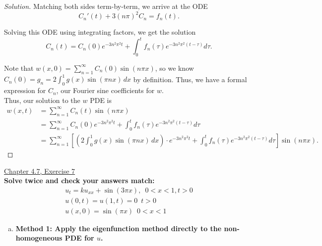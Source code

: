 \documentclass[11pt]{article}
\newenvironment{solution}
  {\renewcommand\qedsymbol{$\blacksquare$}\begin{proof}[Solution]}
  {\end{proof}}
\begin{document}
\begin{solution}
Matching both sides term-by-term, we arrive at the ODE
\[ C_n'(t) + 3(n\pi)^2 C_n = f_n(t).\]

Solving this ODE using integrating factors, we get the solution
\[ C_n(t) = C_n(0)e^{-3n^2\pi^2t} + \int_0^t f_n(\tau) e^{-3n^2\pi^2 (t-\tau)} d\tau. \]

Note that $w(x, 0) = \sum\limits_{n=1}^{\infty} C_n(0)\sin(n\pi x)$, so we know $C_n(0) = g_n = 2\int_0^1 g(x) \sin(\pi n x) \, dx$ by definition. Thus, we have a formal expression for $C_n$, our Fourier sine coefficients for $w$. \\

Thus, our solution to the $w$ PDE is 
\begin{align*}w(x, t) &= \sum\limits_{n=1}^{\infty} C_n(t) \sin(n\pi x) \\
&= \sum\limits_{n=1}^{\infty} C_n(0)e^{-3n^2\pi^2t} + \int_0^t f_n(\tau) e^{-3n^2\pi^2 (t-\tau)} d\tau \\
&= \sum\limits_{n=1}^{\infty} \left[\left(2\int_0^1 g(x) \sin(\pi n x) \, dx\right) \cdot e^{-3n^2\pi^2 t} + \int_0^t f_n(\tau) e^{-3n^2\pi^2 (t-\tau)} d\tau\right]\sin(n\pi x). \end{align*}
\end{solution}

\newpage

\underline{Chapter 4.7, Exercise 7} \\

\textbf{Solve twice and check your answers match:}
\[\begin{array}{c}
u_t = ku_{xx} + \sin(3\pi x), \, \, \, 0 < x < 1, t > 0 \\
u(0, t) = u(1, t) = 0 \, \, \, t>0 \\
u(x,0) = \sin(\pi x) \, \, \, 0 < x < 1
\end{array}\]


\begin{enumerate}[(a)]
    \item \textbf{Method 1: Apply the eigenfunction method directly to the non-homogeneous PDE for $u$.}
\end{enumerate}
\end{document}
